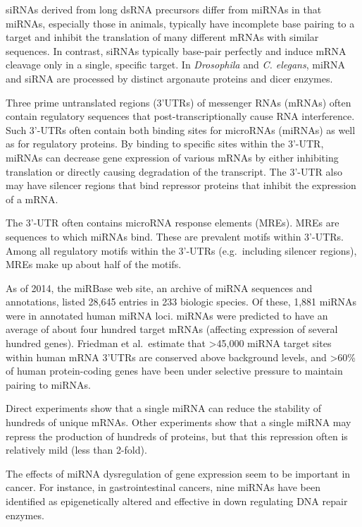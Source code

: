 siRNAs derived from long dsRNA precursors differ from miRNAs in that miRNAs, especially those in animals, typically have incomplete base pairing to a target and inhibit the translation of many different mRNAs with similar sequences. In contrast, siRNAs typically base-pair perfectly and induce mRNA cleavage only in a single, specific target. In \emph{Drosophila} and \emph{C. elegans}, miRNA and siRNA are processed by distinct argonaute proteins and dicer enzymes.

Three prime untranslated regions (3'UTRs) of messenger RNAs (mRNAs) often contain regulatory sequences that post-transcriptionally cause RNA interference. Such 3'-UTRs often contain both binding sites for microRNAs (miRNAs) as well as for regulatory proteins. By binding to specific sites within the 3'-UTR, miRNAs can decrease gene expression of various mRNAs by either inhibiting translation or directly causing degradation of the transcript. The 3'-UTR also may have silencer regions that bind repressor proteins that inhibit the expression of a mRNA.

The 3'-UTR often contains microRNA response elements (MREs). MREs are sequences to which miRNAs bind. These are prevalent motifs within 3'-UTRs. Among all regulatory motifs within the 3'-UTRs (e.g.~including silencer regions), MREs make up about half of the motifs.

As of 2014, the miRBase web site, an archive of miRNA sequences and annotations, listed 28,645 entries in 233 biologic species. Of these, 1,881 miRNAs were in annotated human miRNA loci. miRNAs were predicted to have an average of about four hundred target mRNAs (affecting expression of several hundred genes). Friedman et al.~estimate that \textgreater{}45,000 miRNA target sites within human mRNA 3'UTRs are conserved above background levels, and \textgreater{}60\% of human protein-coding genes have been under selective pressure to maintain pairing to miRNAs.

Direct experiments show that a single miRNA can reduce the stability of hundreds of unique mRNAs. Other experiments show that a single miRNA may repress the production of hundreds of proteins, but that this repression often is relatively mild (less than 2-fold).

The effects of miRNA dysregulation of gene expression seem to be important in cancer. For instance, in gastrointestinal cancers, nine miRNAs have been identified as epigenetically altered and effective in down regulating DNA repair enzymes.

